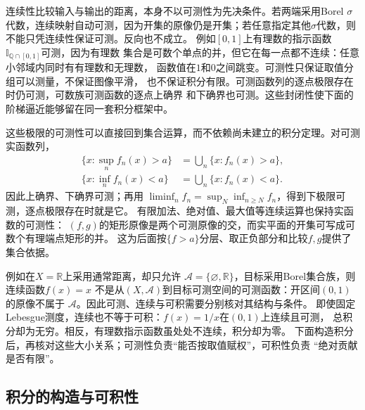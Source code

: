 连续性比较输入与输出的距离，本身不以可测性为先决条件。若两端采用Borel $\sigma$代数，连续映射自动可测，因为开集的原像仍是开集；若任意指定其他$\sigma$代数，则不能只凭连续性保证可测。反向也不成立。
例如$[0,1]$上有理数的指示函数$\mathbb{I}_{\mathbb{Q}\cap[0,1]}$可测，因为有理数
集合是可数个单点的并，但它在每一点都不连续：任意小邻域内同时有有理数和无理数，
函数值在$1$和$0$之间跳变。可测性只保证取值分组可以测量，不保证图像平滑，
也不保证积分有限。可测函数列的逐点极限存在时仍可测，可数族可测函数的逐点上确界
和下确界也可测。这些封闭性使下面的阶梯逼近能够留在同一套积分框架中。

这些极限的可测性可以直接回到集合运算，而不依赖尚未建立的积分定理。对可测实函数列，
\begin{align*}
 \{x:\sup_n f_n(x)>a\}&=\bigcup_n\{x:f_n(x)>a\},\\
 \{x:\inf_n f_n(x)<a\}&=\bigcup_n\{x:f_n(x)<a\}.
\end{align*}
因此上确界、下确界可测；再用
$\liminf_n f_n=\sup_N\inf_{n\geq N}f_n$，得到下极限可测，逐点极限存在时就是它。
有限加法、绝对值、最大值等连续运算也保持实函数的可测性：
$(f,g)$的矩形原像是两个可测原像的交，而实平面的开集可写成可数个有理端点矩形的并。
这为后面按$\{f>a\}$分层、取正负部分和比较$f,g$提供了集合依据。

例如在$X=\mathbb R$上采用通常距离，却只允许
$\mathcal A=\{\varnothing,\mathbb R\}$，目标采用Borel集合族，则连续函数$f(x)=x$
不是从$(X,\mathcal A)$到目标可测空间的可测函数：开区间$(0,1)$的原像不属于
$\mathcal A$。因此可测、连续与可积需要分别核对其结构与条件。
即使固定Lebesgue测度，连续也不等于可积：$f(x)=1/x$在$(0,1)$上连续且可测，
总积分却为无穷。相反，有理数指示函数虽处处不连续，积分却为零。
下面构造积分后，再核对这些大小关系；可测性负责“能否按取值赋权”，可积性负责
“绝对贡献是否有限”。

\subsection{积分的构造与可积性}
